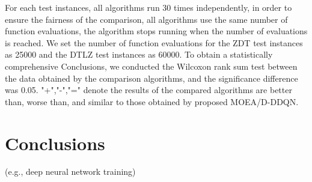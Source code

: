 \documentclass[journal]{IEEEtran}
\begin{document}
For each test instances, all algorithms run 30 times independently, in order to ensure the fairness of the comparison, all algorithms use the same number of function evaluations,
the algorithm stops running when the number of evaluations is reached.
We set the number of function evaluations for the ZDT test instances as 25000 and the DTLZ test instances as 60000.
To obtain a statistically comprehensive Conclusions, we conducted the Wilcoxon rank sum test between the data obtained by the comparison algorithms, and the significance difference was 0.05.
"+","-","=" denote the results of the compared algorithms are better than, worse than, and similar to those obtained by proposed MOEA/D-DDQN.



\section{Conclusions}


 (e.g., deep neural network training)

\ifCLASSOPTIONcaptionsoff
  \newpage
\fi



\end{document}

